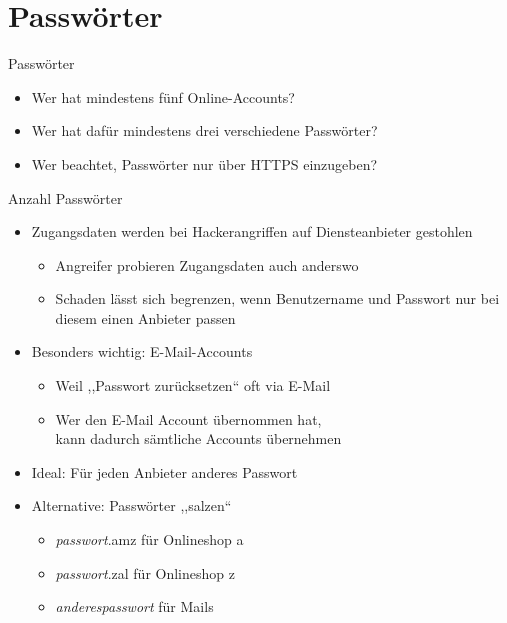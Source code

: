 \section{Passwörter}
\begin{frame}{Passwörter}
  \begin{itemize}
    \item<+->{Wer hat mindestens fünf Online-Accounts?}
    \item<+->{Wer hat dafür mindestens drei verschiedene Passwörter?}
    \item<+->{Wer beachtet, Passwörter nur über HTTPS einzugeben?}
  \end{itemize}
\end{frame}

\begin{frame}{Anzahl Passwörter}
  \begin{itemize}
    \item Zugangsdaten werden bei Hackerangriffen auf Diensteanbieter gestohlen
    \begin{itemize}
      \item Angreifer probieren Zugangsdaten auch anderswo
      \item Schaden lässt sich begrenzen, wenn Benutzername und Passwort nur bei diesem einen Anbieter passen
    \end{itemize}
    \item Besonders wichtig: E-Mail-Accounts
    \begin{itemize}
      \item Weil ,,Passwort zurücksetzen`` oft via E-Mail
      \item Wer den E-Mail Account übernommen hat,\\ kann dadurch sämtliche Accounts übernehmen
    \end{itemize}
    \item Ideal: Für jeden Anbieter anderes Passwort
    \item Alternative: Passwörter ,,salzen``
    \begin{itemize}
      \item \textit{passwort}.amz für Onlineshop a
      \item \textit{passwort}.zal für Onlineshop z
      \item \textit{anderespasswort} für Mails
    \end{itemize}
  \end{itemize}
\end{frame}

